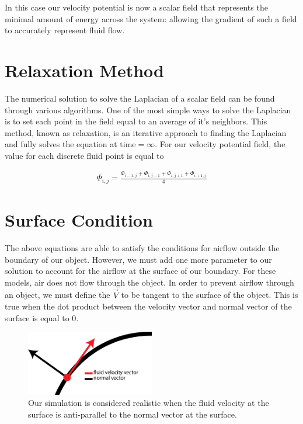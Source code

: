 \documentclass[11pt]{article}
\begin{document}
In this case our velocity potential is now a scalar field that represents the minimal amount of energy across the system: allowing the gradient of such a field to accurately represent fluid flow. 


\section{Relaxation Method}
The numerical solution to solve the Laplacian of a scalar field can be found through various algorithms. One of the most simple ways to solve the Laplacian is to set each point in the field equal to an average of it's neighbors. This method, known as relaxation, is an iterative approach to finding the Laplacian and fully solves the equation at $\text{time} = \infty$. For our velocity potential field, the value for each discrete fluid point is equal to

\begin{align}
 \Phi_{i,j} = \frac{\Phi_{i-1,j} + \Phi_{i,j-1} + \Phi_{i,j+1} +\Phi_{i+1,j} }{4}
\end{align}


\section{Surface Condition}
The above equations are able to satisfy the conditions for airflow outside the boundary of our object. However, we must add one more parameter to our solution to account for the airflow at the surface of our boundary. For these models, air does not flow through the object. In order to prevent airflow through an object, we must define the $\vec{V}$ to be tangent to the surface of the object. This is true when the dot product between the velocity vector and normal vector of the surface is equal to 0.

\begin{figure} [H] %
	\centering
	\includegraphics[width=0.5\textwidth]{lin_surface_condition.png}
	\caption{Our simulation is considered realistic when the fluid velocity at the surface is anti-parallel to the normal vector at the surface.}
	\label{components}
\end{figure}
\end{document}
